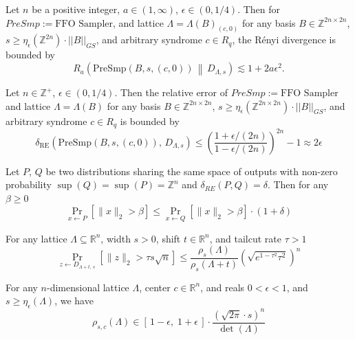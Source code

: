 \begin{corollary}\label{cor:rp-renyi}
Let \(n\) be a positive integer, \(a \in (1 , \infty)\),
\(\epsilon \in (0, 1/4)\). Then for \(PreSmp := \text{FFO Sampler}\),
and lattice \(\Lambda = \Lambda(B)_{(c, 0)}\) for any basis
\(B \in \mathbb{Z}^{2n \times 2n}\),
\(s \ge \eta_\epsilon(\mathbb{Z}^{2n}) \cdot ||B||_{GS}\), and arbitrary
syndrome \(c \in R_q\), the Rényi divergence is bounded by
\[
R_a\!\left(
\mathrm{PreSmp}(B,s,(c,0)) \,\middle\|\, D_{\Lambda,s}
\right)
\lesssim 1 + 2a\epsilon^2.
\]
\end{corollary}

\begin{lemma}\label{lem:ffo-relerror}
Let \(n \in \mathbb{Z}^+\),
\(\epsilon \in (0, 1/4)\). Then the relative error of
\(PreSmp := \text{FFO Sampler}\) and lattice \(\Lambda = \Lambda(B)\)
for any basis \(B \in \mathbb{Z}^{2n \times 2n}\),
\(s \ge \eta_\epsilon(\mathbb{Z}^{2n \times 2n}) \cdot ||B||_{GS}\), and
arbitrary syndrome \(c \in R_q\) is bounded by
\[
\delta_{\mathrm{RE}}\!\left(
    \mathrm{PreSmp}(B,s,(c,0)),\, D_{\Lambda,s}
\right)
\le
\left(
    \frac{1+\epsilon/(2n)}{1-\epsilon/(2n)}
\right)^{2n}
- 1
\approx 2\epsilon 
\]
\end{lemma}

\begin{lemma}\label{lem:relerror-tail}
Let \(P\), \(Q\) be two distributions
sharing the same space of outputs with non-zero probability
\(\sup(Q) = \sup(P) = \mathbb{Z}^{n}\) and
\(\delta_{RE}(P, Q) = \delta\). Then for any \(\beta \ge 0\)
\[
\Pr_{x \leftarrow P}\!\left[\|x\|_2 > \beta\right]
\le
\Pr_{x \leftarrow Q}\!\left[\|x\|_2 > \beta\right] \cdot (1+\delta)
\]
\end{lemma}

\begin{lemma}\label{lem:gauss-tail}
For any lattice
\(\Lambda \subseteq \mathbb{R}^n\), width \(s > 0\), shift
\(t \in \mathbb{R}^n\), and tailcut rate \(\tau > 1\)
\[
\Pr_{z \leftarrow D_{\Lambda + t,\, s}}
\!\left[
\|z\|_2 > \tau s \sqrt{n}
\right]
\le
\frac{\rho_s(\Lambda)}{\rho_s(\Lambda + t)}
\left(
\sqrt{e^{1 - \tau^2}\tau^2}
\right)^n 
\]
\end{lemma}

\begin{lemma}\label{lem:gauss-mass}
For any \(n\)-dimensional lattice \(\Lambda\), center
\(c \in \mathbb{R}^n\), and reals \(0 < \epsilon < 1\), and
\(s \ge \eta_\epsilon(\Lambda)\), we have
\[
\rho_{s,c}(\Lambda)
\in
[\,1-\epsilon,\;1+\epsilon\,]
\cdot
\frac{(\sqrt{2\pi} \cdot s)^n}{\det(\Lambda)}
\]
\end{lemma}

